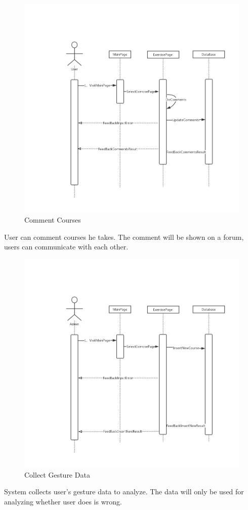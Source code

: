 \documentclass[16pt]{scrreprt}
\begin{document}
\begin{figure}[H]
    \includegraphics[width=\linewidth]{./FuncPhoto/13.png}   
    \caption{Comment Courses}
\end{figure}
User can comment courses he takes. The comment will be shown on a forum, users can communicate with each other.

\begin{figure}[H]
    \includegraphics[width=\linewidth]{./FuncPhoto/14.png}   
    \caption{Collect Gesture Data}
\end{figure}
System collects user's gesture data to analyze. The data will only be used for analyzing whether user does is wrong. 
\end{document}
